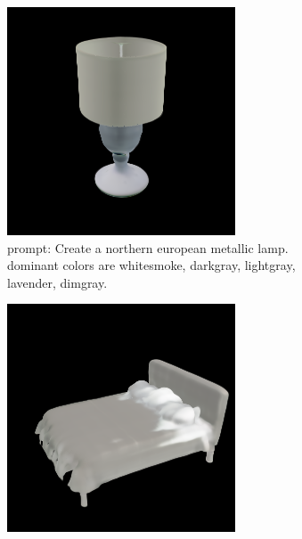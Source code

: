 \documentclass[11pt]{article}
\begin{document}
\begin{figure}[htbp]
    \begin{subfigure}[t]{0.3\textwidth}
        \centering
        \includegraphics[width=\textwidth]{figures/northern_furniture.png}
        \caption{prompt: Create a northern european metallic lamp. dominant colors are whitesmoke, darkgray, lightgray, lavender, dimgray.}
        \label{fig:northern_european_furniture}
    \end{subfigure}
    \hfill
    \begin{subfigure}[t]{0.3\textwidth}
        \centering
        \includegraphics[width=\textwidth]{figures/romantic_furniture.png}

\end{subfigure}
\end{figure}
\end{document}

